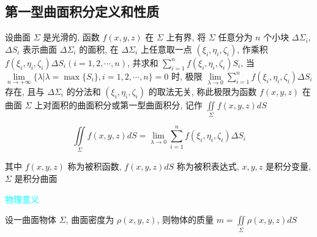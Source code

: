 \subsection{第一型曲面积分定义和性质}
\begin{definition}[第一型曲面积分]
	设曲面 $\Sigma$ 是光滑的, 函数 $f(x,y,z)$ 在 $\Sigma$ 上有界, 将 $\Sigma$ 任意分为 $n$ 个小块 $\Delta \Sigma_{i}$, $\Delta S_{i}$ 表示曲面 $\Delta\Sigma_{i}$ 的面积, 
	在 $\Delta\Sigma_{i}$ 上任意取一点 $(\xi_{i},\eta_{i},\zeta_{i})$, 作乘积 $f(\xi_{i},\eta_{i},\zeta_{i})\Delta S_{i}(i=1,2,\cdots,n)$, 并求和 
	$\sum\limits_{i=1}^{n}f(\xi_{i},\eta_{i},\zeta_{i})S_{i}$, 当 $\lim\limits_{n \to +\infty}\{\lambda|\lambda = \max\{S_{i}\}, i =1,2,\cdots,n\} = 0$ 
	时, 极限 $\lim\limits_{\lambda \to 0}\sum\limits_{i=1}^{n}f(\xi_{i},\eta_{i},\zeta_{i})\Delta S_{i}$ 存在, 且与 $\Delta\Sigma_{i}$ 的分法和 $(\xi_{i},\eta_{i},\zeta_{i})$ 
	的取法无关, 称此极限为函数 $f(x,y,z)$ 在曲面 $\Sigma$ 上对面积的曲面积分或第一型曲面积分, 记作 $\iint\limits_{\Sigma}f(x,y,z)dS$

	$$\iint\limits_{\Sigma}f(x,y,z)dS = \lim\limits_{\lambda \to 0}\sum\limits_{i=1}^{n}f(\xi_{i},\eta_{i},\zeta_{i})\Delta S_{i}$$

	其中 $f(x,y,z)$ 称为被积函数, $f(x,y,z)dS$ 称为被积表达式, $x,y,z$ 是积分变量, $\Sigma$ 是积分曲面

	\textcolor{cyan}{物理意义}

	设一曲面物体 $\Sigma$, 曲面密度为 $\rho(x,y,z)$, 则物体的质量 $m = \iint\limits_{\Sigma}\rho(x,y,z)dS$
\end{definition}

